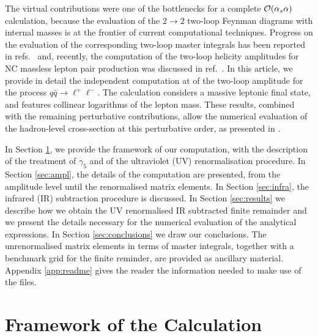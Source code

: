\documentclass[11pt,a4paper]{article}
\begin{document}
The virtual contributions were one of the bottlenecks for a complete ${\cal O}(\alpha_{s}\alpha)$ calculation, because
the evaluation of the $2\to 2$ two-loop Feynman diagrams with internal masses is at the frontier of current computational techniques.
Progress on the evaluation of the corresponding two-loop master integrals has been reported in refs.~\cite{Bonciani:2016ypc,Heller:2019gkq,Hasan:2020vwn,Long:2021fdc}
and, recently,
the computation of the two-loop helicity amplitudes for NC massless lepton pair production was discussed in ref.~\cite{Heller:2020owb}.
%
In this article, we provide in detail the independent computation at \oaas of the two-loop amplitude for the process $q\bar q\to\ell^+\ell^-$.
The calculation considers a massive leptonic final state,
and features collinear logarithms of the lepton mass.
These results, combined with the remaining perturbative contributions,
allow the numerical evaluation of the hadron-level cross-section at this perturbative order,
as presented in \cite{Bonciani:2021zzf}.


In Section \ref{sec:frame},
we provide the framework of our computation, with the description of
the treatment of $\gamma_5$ and of the ultraviolet (UV)
renormalisation procedure.
In Section \ref{sec:ampl},
the details of the computation are presented,
from the amplitude level until the renormalised matrix elements.
In Section \ref{sec:infra},
the infrared (IR) subtraction procedure is discussed.
In Section \ref{sec:results}
we describe how we obtain the UV renormalised IR subtracted finite remainder
and we present the details necessary for the numerical evaluation
of the analytical expressions.
In Section \ref{sec:conclusions}
we draw our conclusions.
The unrenormalised matrix elements in terms of master integrals,
together with a benchmark grid for the finite reminder,
are provided as ancillary material.
Appendix \ref{app:readme} gives the reader the information needed to make use of the files.


\section{Framework of the Calculation}
\label{sec:frame}
\end{document}

